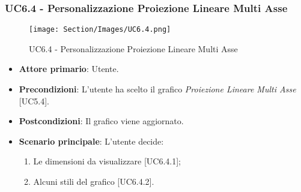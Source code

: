 \subsubsection{UC6.4 - Personalizzazione Proiezione Lineare Multi Asse}
\begin{figure}[h]
\texttt{[image: Section/Images/UC6.4.png]}
\centering
\caption{UC6.4 - Personalizzazione Proiezione Lineare Multi Asse}
\end{figure}
\begin{itemize}
	\item \textbf{Attore primario}: Utente.
	
	\item \textbf{Precondizioni}: L'utente ha scelto il grafico \textit{Proiezione Lineare Multi Asse} [UC5.4].
	
	\item \textbf{Postcondizioni}: Il grafico viene aggiornato.
	
	\item \textbf{Scenario principale}: L'utente decide:
	
\begin{enumerate}
\item Le dimensioni da visualizzare [UC6.4.1];
\item Alcuni stili del grafico [UC6.4.2].
\end{enumerate}	
		
\end{itemize}